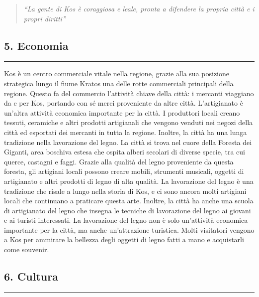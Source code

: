 \begin{quote}
\emph{``La gente di Kos è coraggiosa e leale, pronta a difendere la
propria città e i propri diritti''}
\end{quote}

\subsection{5. Economia}\label{economia}

\begin{center}\rule{0.5\linewidth}{0.5pt}\end{center}

Kos è un centro commerciale vitale nella regione, grazie alla sua
posizione strategica lungo il fiume Kratos una delle rotte commerciali
principali della regione. Questo fa del commercio l'attività chiave
della città: i mercanti viaggiano da e per Kos, portando con sé merci
proveniente da altre città. L'artigianato è un'altra attività economica
importante per la città. I produttori locali creano tessuti, ceramiche e
altri prodotti artigianali che vengono venduti nei negozi della città ed
esportati dei mercanti in tutta la regione. Inoltre, la città ha una
lunga tradizione nella lavorazione del legno. La città si trova nel
cuore della Foresta dei Giganti, area boschiva estesa che ospita alberi
secolari di diverse specie, tra cui querce, castagni e faggi. Grazie
alla qualità del legno proveniente da questa foresta, gli artigiani
locali possono creare mobili, strumenti musicali, oggetti di artigianato
e altri prodotti di legno di alta qualità. La lavorazione del legno è
una tradizione che risale a lungo nella storia di Kos, e ci sono ancora
molti artigiani locali che continuano a praticare questa arte. Inoltre,
la città ha anche una scuola di artigianato del legno che insegna le
tecniche di lavorazione del legno ai giovani e ai turisti interessati.
La lavorazione del legno non è solo un'attività economica importante per
la città, ma anche un'attrazione turistica. Molti visitatori vengono a
Kos per ammirare la bellezza degli oggetti di legno fatti a mano e
acquistarli come souvenir.

\subsection{6. Cultura}\label{cultura}

\begin{center}\rule{0.5\linewidth}{0.5pt}\end{center}

